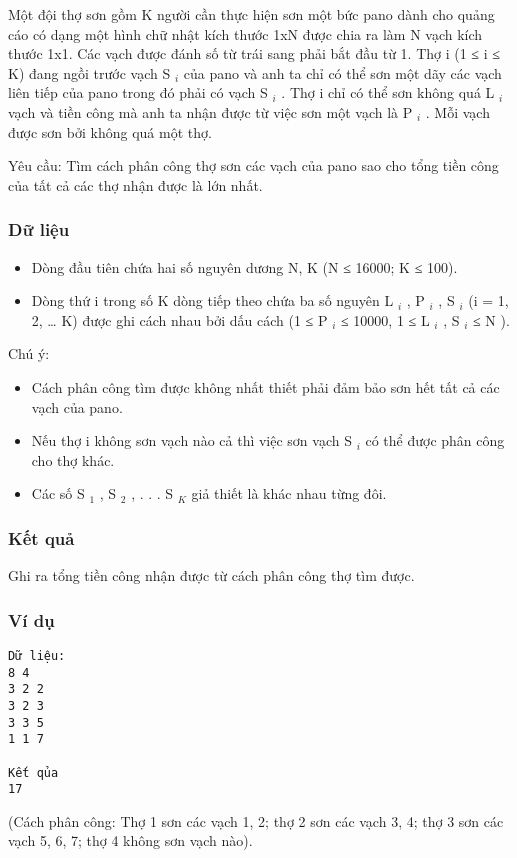 



   Một đội thợ sơn gồm K người cần thực hiện sơn một bức pano dành cho quảng cáo có dạng một hình chữ nhật kích thước 1xN được chia ra làm N vạch kích thước 1x1. Các vạch được đánh số từ trái   sang phải bắt đầu từ 1. Thợ i (1 ≤ i ≤ K) đang ngồi trước vạch S   $_    i   $   của pano và anh ta chỉ có thể sơn một dãy các vạch liên tiếp của pano trong đó phải có vạch S   $_    i   $   . Thợ i chỉ có thể   sơn không quá L   $_    i   $   vạch và tiền công mà anh ta nhận được từ việc sơn một vạch là P   $_    i   $   . Mỗi vạch được sơn bởi không quá một thợ.  

   Yêu cầu: Tìm cách phân công thợ sơn các vạch của pano sao cho tổng tiền công của tất cả các thợ nhận được là lớn nhất.  

\subsubsection{   Dữ liệu  }
\begin{itemize}
	\item     Dòng đầu tiên chứa hai số nguyên dương N, K (N ≤ 16000; K ≤ 100).   
	\item     Dòng thứ i trong số K dòng tiếp theo chứa ba số nguyên  L    $_     i    $    , P    $_     i    $    , S    $_     i    $    (i = 1, 2, … K) được ghi cách nhau bởi dấu cách (1 ≤  P    $_     i    $    ≤ 10000, 1 ≤   L    $_     i    $    , S    $_     i    $    ≤  N ).   
\end{itemize}

   Chú ý:  
\begin{itemize}
	\item     Cách phân công tìm được không nhất thiết phải đảm bảo sơn hết tất cả các vạch của pano.   
	\item     Nếu thợ i không sơn vạch nào cả thì việc sơn vạch S    $_     i    $    có thể được phân công cho thợ khác.   
	\item     Các số S    $_     1    $    , S    $_     2    $    , . . . S    $_     K    $    giả thiết là khác nhau từng đôi.   
\end{itemize}

\subsubsection{   Kết quả  }

   Ghi ra tổng tiền công nhận được từ cách phân công thợ tìm được.  

\subsubsection{   Ví dụ  }
\begin{verbatim}
Dữ liệu:
8 4
3 2 2
3 2 3
3 3 5
1 1 7  

Kết qủa
17
\end{verbatim}

   (Cách phân công: Thợ 1 sơn các vạch 1, 2; thợ 2 sơn các vạch 3, 4; thợ 3 sơn các vạch 5, 6, 7; thợ 4 không sơn vạch nào).  